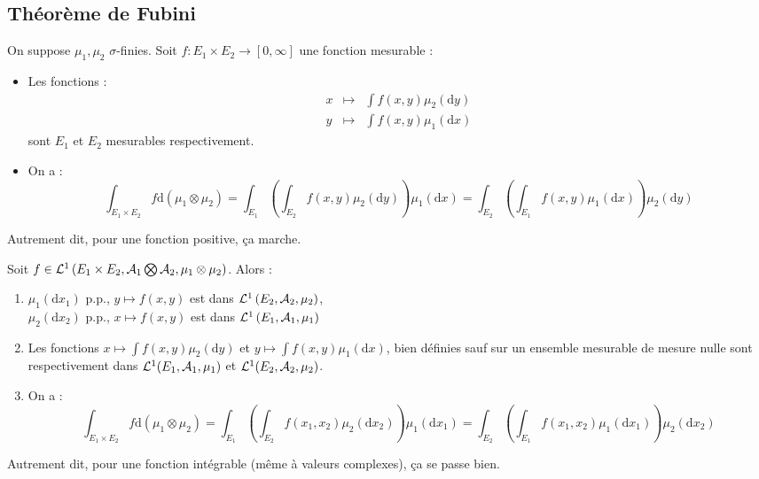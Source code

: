 \documentclass{cours}
\begin{document}
        \subsection{Théorème de Fubini}
        \begin{theorem}
            On suppose $\mu_{1}, \mu_{2}$ $\sigma$-finies. Soit $f : E_{1} \times E_{2} \rightarrow \left[0, \infty\right]$ une fonction mesurable : 
            \begin{itemize}
                \item Les fonctions : 
                \[
                    \begin{aligned}
                        x&\mapsto&\int f(x, y) \mu_{2}(\mathrm{d}y)\\
                        y&\mapsto&\int f(x, y) \mu_{1}(\mathrm{d}x)
                    \end{aligned}               
                \]
                sont $E_{1}$ et $E_{2}$ mesurables respectivement.
                \item On a : 
                \[  
                    \int_{E_{1} \times E_{2}} f \mathrm{d}(\mu_{1} \otimes \mu_{2}) = \int_{E_{1}}\left(\int_{E_{2}} f(x, y)\mu_{2}\left(\mathrm{d}y\right)\right)\mu_{1}\left(\mathrm{d}x\right) = \int_{E_{2}}\left(\int_{E_{1}} f(x, y)\mu_{1}\left(\mathrm{d}x\right)\right)\mu_{2}\left(\mathrm{d}y\right)
                \]
            \end{itemize}
        \end{theorem}
        Autrement dit, pour une fonction positive, ça marche.

        \begin{theorem}
            Soit $f \in \mathcal{L}^{1}\left(E_{1} \times E_{2}, \mathcal{A}_{1} \bigotimes \mathcal{A}_{2}, \mu_{1}\otimes\mu_{2}\right)$. Alors : 
            \begin{enumerate}
                \item $\mu_{1}(\mathrm{d}x_{1})$ p.p., $y \mapsto f(x, y)$ est dans $\mathcal{L}^{1}\left(E_{2}, \mathcal{A}_{2}, \mu_{2}\right)$,\\
                $\mu_{2}(\mathrm{d}x_{2})$ p.p., $x \mapsto f(x, y)$ est dans $\mathcal{L}^{1}\left(E_{1}, \mathcal{A}_{1}, \mu_{1}\right)$
                \item Les fonctions $x \mapsto \int f(x, y) \mu_{2}(\mathrm{d}y)$ et $y \mapsto \int f(x, y)\mu_{1}\left(\mathrm{d}x\right)$, bien définies sauf sur un ensemble mesurable de mesure nulle sont respectivement dans $\mathcal{L}^{1}(E_{1}, \mathcal{A}_{1}, \mu_{1})$ et $\mathcal{L}^{1}(E_{2}, \mathcal{A}_{2}, \mu_{2})$.
                \item On a :
                \[
                    \int_{E_{1} \times E_{2}} f \mathrm{d}\left(\mu_{1}\otimes\mu_{2}\right) = \int_{E_{1}}\left(\int_{E_{2}}f(x_{1}, x_{2})\mu_{2}(\mathrm{d}x_{2})\right) \mu_{1}\left(\mathrm{d}x_{1}\right) = \int_{E_{2}}\left(\int_{E_{1}}f(x_{1}, x_{2})\mu_{1}(\mathrm{d}x_{1})\right) \mu_{2}\left(\mathrm{d}x_{2}\right)
                \]
            \end{enumerate}
        \end{theorem}
        Autrement dit, pour une fonction intégrable (même à valeurs complexes), ça se passe bien.
        
\end{document}
